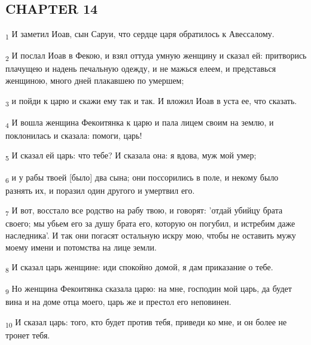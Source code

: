 \subsection{CHAPTER 14}
\begin{tcolorbox}
\textsubscript{1} И заметил Иоав, сын Саруи, что сердце царя обратилось к Авессалому.
\end{tcolorbox}
\begin{tcolorbox}
\textsubscript{2} И послал Иоав в Фекою, и взял оттуда умную женщину и сказал ей: притворись плачущею и надень печальную одежду, и не мажься елеем, и представься женщиною, много дней плакавшею по умершем;
\end{tcolorbox}
\begin{tcolorbox}
\textsubscript{3} и пойди к царю и скажи ему так и так. И вложил Иоав в уста ее, что сказать.
\end{tcolorbox}
\begin{tcolorbox}
\textsubscript{4} И вошла женщина Фекоитянка к царю и пала лицем своим на землю, и поклонилась и сказала: помоги, царь!
\end{tcolorbox}
\begin{tcolorbox}
\textsubscript{5} И сказал ей царь: что тебе? И сказала она: я вдова, муж мой умер;
\end{tcolorbox}
\begin{tcolorbox}
\textsubscript{6} и у рабы твоей [было] два сына; они поссорились в поле, и некому было разнять их, и поразил один другого и умертвил его.
\end{tcolorbox}
\begin{tcolorbox}
\textsubscript{7} И вот, восстало все родство на рабу твою, и говорят: 'отдай убийцу брата своего; мы убьем его за душу брата его, которую он погубил, и истребим даже наследника'. И так они погасят остальную искру мою, чтобы не оставить мужу моему имени и потомства на лице земли.
\end{tcolorbox}
\begin{tcolorbox}
\textsubscript{8} И сказал царь женщине: иди спокойно домой, я дам приказание о тебе.
\end{tcolorbox}
\begin{tcolorbox}
\textsubscript{9} Но женщина Фекоитянка сказала царю: на мне, господин мой царь, да будет вина и на доме отца моего, царь же и престол его неповинен.
\end{tcolorbox}
\begin{tcolorbox}
\textsubscript{10} И сказал царь: того, кто будет против тебя, приведи ко мне, и он более не тронет тебя.
\end{tcolorbox}

